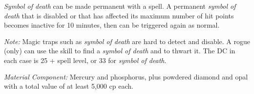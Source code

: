 {	\emph{Symbol of death} can be made permanent with a  spell. A permanent \emph{symbol of death} that is disabled or that has affected its maximum number of hit points becomes inactive for 10 minutes, then can be triggered again as normal.

	\textit{Note:}
	Magic traps such as \emph{symbol of death} are hard to detect and disable. A rogue (only) can use the  skill to find a \emph{symbol of death} and  to thwart it. The DC in each case is 25 + spell level, or 33 for \emph{symbol of death}.

	\textit{Material Component:}
	Mercury and phosphorus, plus powdered diamond and opal with a total value of at least 5,000 cp each.

}

